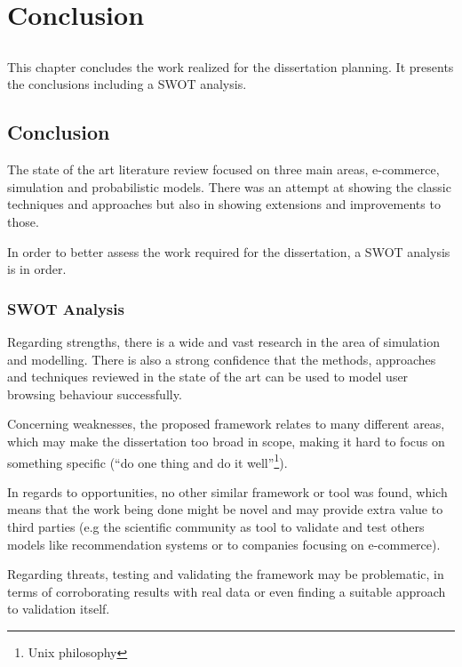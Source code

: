 \chapter{Conclusion} \label{chap:conclusion}

\section*{}

This chapter concludes the work realized for the dissertation planning. It 
presents the conclusions including a SWOT analysis.

\section{Conclusion}

The state of the art literature review focused on three main areas, e-commerce, 
simulation and probabilistic models. There was an attempt at showing the 
classic techniques and approaches but also in showing extensions and 
improvements to those.

In order to better assess the work required for the dissertation, a SWOT 
analysis is in order.

\subsection{SWOT Analysis}

Regarding strengths, there is a wide and vast research in the area of 
simulation and modelling. There is also a strong confidence that the methods, 
approaches and techniques reviewed in the state of the art can be used to model 
user browsing behaviour successfully.

Concerning weaknesses, the proposed framework relates to many different areas, 
which may make the dissertation too broad in scope, making it hard to focus on 
something specific (``do one thing and do it well''\footnote{Unix philosophy}).

In regards to opportunities, no other similar framework or tool was found, 
which means that the work being done might be novel and may provide extra value 
to third parties (e.g the scientific community as tool to validate and test 
others models like recommendation systems or to companies focusing on 
e-commerce).

Regarding threats, testing and validating the framework may be problematic, in 
terms of corroborating results with real data or even finding a suitable 
approach to validation itself.
